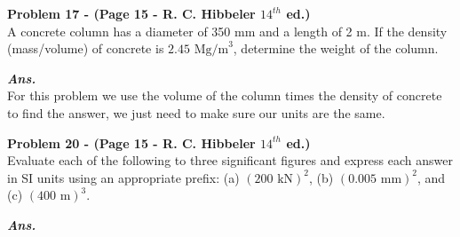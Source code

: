 \documentclass[letterpaper, 11pt]{article}
\newenvironment{problem}[2][Problem]
    { \begin{mdframed} \textbf{#1 #2} \\}
    {  \end{mdframed}}
\newenvironment{solution}
    {\textbf{\textit{Ans.}}\\}
    { }
\begin{document}
\begin{problem}{17 - (Page 15 - R. C. Hibbeler $14^{th}$ ed.)}
    A concrete column has a diameter of 350 mm and
    a length of 2 m. If the density (mass/volume) of concrete is
    $2.45\text{ Mg/m}^3$, determine the weight of the column.
\end{problem}
\begin{solution}
    For this problem we use the volume of the column times the density of concrete to find the answer, we just need to make sure our units are the same.
\end{solution}
\begin{problem}{20 - (Page 15 - R. C. Hibbeler $14^{th}$ ed.)}
    Evaluate each of the following to three significant
figures and express each answer in SI units using an
appropriate prefix: (a) $(200 \text{ kN})^2$, (b) $(0.005\text{ mm})^2$, and (c)
$(400\text{ m})^3$.
\end{problem}
\begin{solution}
    \pagebreak
\end{solution}
\end{document}

